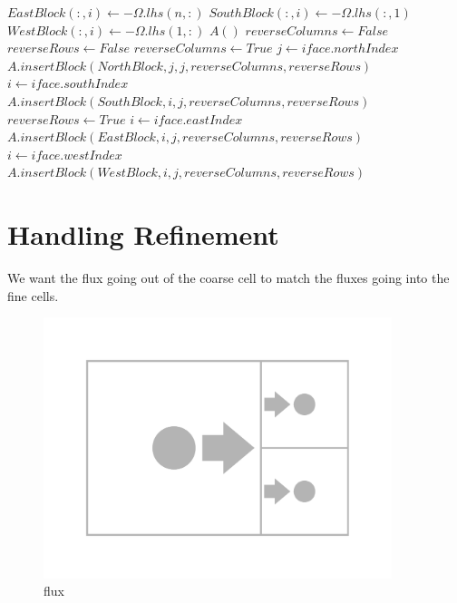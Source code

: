 \documentclass[12pt]{article}
\begin{document}
\begin{algorithmic}[1]
         \State $EastBlock(:,i) \gets -\Omega.lhs(n,:)$
         \State $SouthBlock(:,i) \gets -\Omega.lhs(:,1)$
         \State $WestBlock(:,i) \gets -\Omega.lhs(1,:)$
    \EndFor
    \State $A()$ 
     
        \State $reverseColumns \gets False$
        \State $reverseRows \gets False$
             \State $reverseColumns \gets True$
        \EndIf
        \State
        \State $j \gets iface.northIndex$
        \State $A.insertBlock(NorthBlock,j,j,reverseColumns,reverseRows)$
        \State
            \State $i \gets iface.southIndex$
            \State $A.insertBlock(SouthBlock,i,j,reverseColumns,reverseRows)$
        \EndIf
        \State
             \State $reverseRows \gets True$
        \EndIf
        \State
            \State $i \gets iface.eastIndex$
            \State $A.insertBlock(EastBlock,i,j,reverseColumns,reverseRows)$
        \EndIf
        \State
            \State $i \gets iface.westIndex$
            \State $A.insertBlock(WestBlock,i,j,reverseColumns,reverseRows)$
        \EndIf
        \State
    \EndFor
    \EndProcedure
\end{algorithmic}




\section{Handling Refinement}
We want the flux going out of the coarse cell to match the fluxes going into 
the fine cells.

\begin{figure}[H]
    \centering
    \includegraphics[width=4in]{images/amrflux.pdf}
    \caption{flux}
\end{figure}
\end{document}
